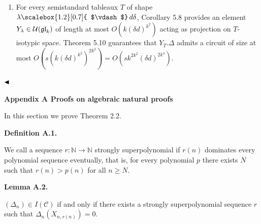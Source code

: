 \documentclass[10pt,a4paper]{article}
\begin{document}
\begin{enumerate}
\item 
 


For every semistandard tableaux $T$ of shape $\lambda\mathchoice{\scalebox{1.2}[0.7]{ $\vdash$}\,}{\scalebox{1.2}[0.7]{ $\vdash$}\,}{\scalebox{0.7}{\scalebox{1.2}[0.7]{$\vdash$}}\,}{\scalebox{0.5}{\scalebox{1.2}[0.7]{$\vdash$}}\,}d\delta$, Corollary 5.8 provides an element $Y_{\lambda}\nobreak\in\nobreak\mathcal{U}(\mathfrak{gl}_{k})$ of length at most $O(k(\delta d)^{k^{2}})$ acting as projection on $T$-isotypic space. Theorem 5.10 guarantees that $Y_{T}.\Delta$ admits a circuit of size at most $O(s(k(\delta d)^{k^{2}})^{2k^{2}})=O(sk^{2k^{2}}(\delta d)^{2k^{4}})$.





\end{enumerate}


$\hfill\blacktriangleleft$








\par\medskip\noindent\textbf{Appendix A Proofs on algebraic natural proofs}\par




In this section we prove Theorem 2.2.





\par\medskip\noindent\textbf{Definition A.1.}\par



We call a sequence $r\colon\mathbb{N}\to\mathbb{N}$ strongly superpolynomial if $r(n)$ dominates every polynomial sequence eventually, that is, for every polynomial $p$ there exists $N$ such that $r(n)>p(n)$ for all $n\geq N$.






\par\medskip\noindent\textbf{Lemma A.2.}\par



$(\Delta_{n})\in I(\mathcal{C})$ if and only if there exists a strongly superpolynomial sequence $r$ such that $\Delta_{n}(X_{n,r(n)})=0$.
\end{document}
